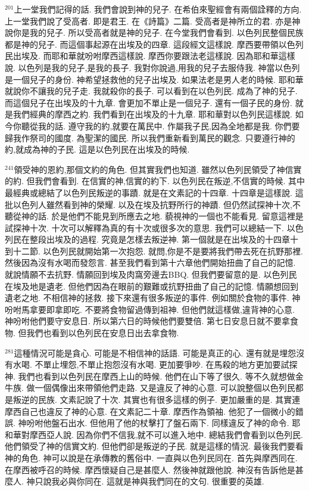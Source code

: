 \documentclass{book}
\begin{document}
$^{201}$上一堂我們記得的話.
我們會說到神的兒子.
在希伯來聖經會有兩個詮釋的方向.
上一堂我們說了受高者.
即是君王.
在《詩篇》二篇.
受高者是神所立的君.
亦是神說你是我的兒子.
所以受高者就是神的兒子.
在今堂我們會看到.
以色列民整個民族都是神的兒子.
而這個事起源在出埃及的四章.
這段經文這樣說.
摩西要帶領以色列民出埃及.
而耶和華就吩咐摩西這樣說.
摩西你要跟法老這樣說.
因為耶和華這樣說.
以色列是我的兒子,是我的長子.
我對你說過,用我的兒子去服侍我.
神當以色列是一個兒子的身份.
神希望拯救他的兒子出埃及.
如果法老是男人老的時候.
耶和華就說你不讓我的兒子走.
我就殺你的長子.
可以看到在以色列民.
成為了神的兒子.
而這個兒子在出埃及的十九章.
會更加不單止是一個兒子.
還有一個子民的身份.
就是我們經典的摩西之約.
我們看到在出埃及的十九章.
耶和華對以色列民這樣說.
如今你聽從我的話.
遵守我的約,就要在萬民中.
作屬我子民,因為全地都是我.
你們要歸我作祭司的國度.
為聖潔的國民.
所以我們重新看到萬民的觀念.
只要遵行神的約,就成為神的子民.
這是以色列民在出埃及的時候.

$^{241}$領受神的恩約,那個文約的角色.
但其實我們也知道.
雖然以色列民領受了神信實的約.
但我們會看到.
在信實的神,信實的約下.
以色列民在叛逆,不信實的時候.
其中最經典或總結了以色列民叛逆的事蹟.
就是在文素記的十四章.
十四章是這樣說.
這批以色列人雖然看到神的榮耀.
以及在埃及抗野所行的神蹟.
但仍然試探神十次,不聽從神的話.
於是他們不能見到所應去之地.
藐視神的一個也不能看見.
留意這裡是試探神十次.
十次可以解釋為真的有十次或很多次的意思.
我們可以總結一下.
以色列民在整段出埃及的過程.
究竟是怎樣去叛逆神.
第一個就是在出埃及的十四章十到十二節.
以色列民就開始第一次抱怨.
就問,你是不是要將我們帶去死在抗野那裡.
然後因為沒有水喝而發怨言.
甚至我們看到第十六章他們開始扭曲了自己的記憶.
就說情願不去抗野.
情願回到埃及肉窩旁邊去BBQ.
但我們要留意的是.
以色列民在埃及地是遺老.
但他們因為在眼前的艱難或抗野扭曲了自己的記憶.
情願想回到遺老之地.
不相信神的拯救.
接下來還有很多叛逆的事件.
例如關於食物的事件.
神吩咐馬拿要即拿即吃.
不要將食物留過傳到祖神.
但他們就這樣做,違背神的心意.
神吩咐他們要守安息日.
所以第六日的時候他們要雙倍.
第七日安息日就不要拿食物.
但我們也看到以色列民在安息日出去拿食物.

$^{281}$這種情況可能是貪心.
可能是不相信神的話語.
可能是真正的心.
還有就是埋怨沒有水喝.
不單止埋怨,不單止抱怨沒有水喝.
更加要爭吵.
在馬殺的地方更加要試探神.
我們也看到以色列民在摩西上山的時候.
他們在山下等了很久.
等不久就想做金牛族.
做一個偶像出來帶領他們走路.
又是違反了神的心意.
可以說整個以色列民都是叛逆的民族.
文素記說了十次.
其實也有很多這樣的例子.
更加嚴重的是.
其實連摩西自己也違反了神的心意.
在文素記二十章.
摩西作為領袖.
他犯了一個微小的錯誤.
神吩咐他盤石出水.
但他用了他的杖擊打了盤石兩下.
同樣違反了神的命令.
耶和華對摩西亞人說.
因為你們不信我,就不可以進入地中.
總結我們會看到以色列民.
他們領受了神的信實文約.
但他們卻是叛逆的子民.
就是這樣的情況.
最後我們要看神的角色.
神可以說是在承傳教的舊俗中.
一直與以色列民同在.
首先與摩西同在.
在摩西被呼召的時候.
摩西懷疑自己是甚麼人.
然後神就跟他說.
神沒有告訴他是甚麼人.
神只說我必與你同在.
這就是神與我們同在的文句.
很重要的英雄.
\end{document}
